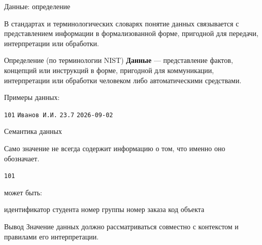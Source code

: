 \documentclass[aspectratio=169]{beamer}
\begin{document}





\begin{frame}{Данные: определение}

В стандартах и терминологических словарях понятие данных
связывается с представлением информации в формализованной
форме, пригодной для передачи, интерпретации или обработки.

\vspace{0.3cm}

\begin{block}{Определение (по терминологии NIST)}
\textbf{Данные} — представление фактов, концепций
или инструкций в форме, пригодной для коммуникации,
интерпретации или обработки человеком либо
автоматическими средствами.
\end{block}

\vspace{0.3cm}

Примеры данных:

\begin{center}
\texttt{101} \quad
\texttt{Иванов И.И.} \quad
\texttt{23.7} \quad
\texttt{2026-09-02}
\end{center}

\end{frame}


\begin{frame}{Семантика данных}

Само значение не всегда содержит информацию о том,
что именно оно обозначает.

\begin{center}
\Huge
\texttt{101}
\end{center}

\begin{center}
может быть:
\end{center}

\begin{center}
идентификатор студента
\quad
номер группы
\quad
номер заказа
\quad
код объекта
\end{center}

\vspace{0.3cm}

\begin{alertblock}{Вывод}
Значение данных должно рассматриваться совместно
с контекстом и правилами его интерпретации.
\end{alertblock}

\end{frame}
\end{document}
